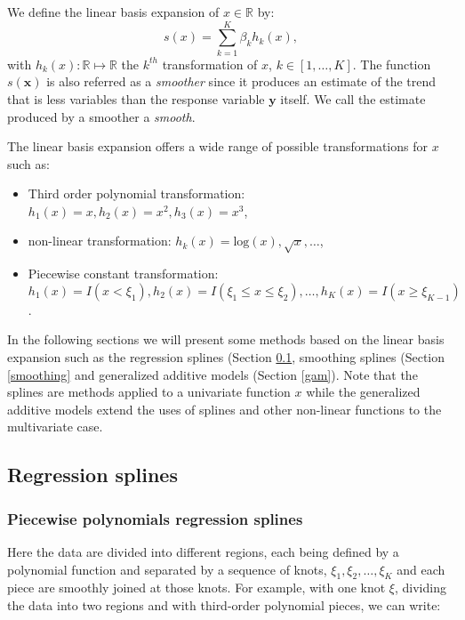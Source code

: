 \documentclass[]{book}
\begin{document}
We define the linear basis expansion of \(x \in \mathbb{R}\) by:
\[s(x) = \sum_{k=1}^K \beta_k h_k(x),\] with
\(h_k(x) : \mathbb{R} \mapsto \mathbb{R}\) the \(k^{th}\) transformation of
\(x\), \(k \in [1, \dots, K]\). The function \(s(\mathbf{x})\) is also referred as a
\emph{smoother} since it produces an estimate of the trend that is less
variables than the response variable \(\mathbf{y}\) itself. We call the estimate
produced by a smoother a \emph{smooth}.

The linear basis expansion offers a wide range of possible
transformations for \(x\) such as:

\begin{itemize}
\item
  Third order polynomial transformation:
  \(h_1(x) = x, h_2(x) = x^2, h_3(x) = x^3\),
\item
  non-linear transformation:
  \(h_k(x) = \text{log}(x), \sqrt{x}, \dots\),
\item
  Piecewise constant transformation:
  \(h_1(x) = I(x < \xi_1), h_2(x) = I(\xi_1 \leq x \leq \xi_2), \dots, h_K(x) = I(x \geq \xi_{K-1})\).
\end{itemize}

In the following sections we will present some methods based on the
linear basis expansion such as the regression splines (Section
\ref{splines}, smoothing splines (Section \ref{smoothing} and
generalized additive models (Section \ref{gam}). Note that the
splines are methods applied to a univariate function \(x\) while the
generalized additive models extend the uses of splines and other
non-linear functions to the multivariate case.

\hypertarget{splines}{%
\subsection{Regression splines}\label{splines}}

\hypertarget{piecewise-polynomials-regression-splines}{%
\subsubsection*{Piecewise polynomials regression splines}\label{piecewise-polynomials-regression-splines}}

Here the data are divided into different regions, each being defined by
a polynomial function and separated by a sequence of knots,
\(\xi_1, \xi_2, \dots, \xi_K\) and each piece are smoothly joined at those
knots. For example, with one knot \(\xi\), dividing the data into two
regions and with third-order polynomial pieces, we can write:
\end{document}
